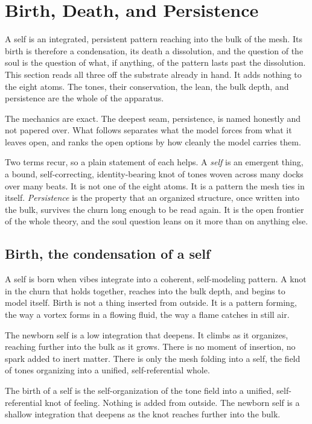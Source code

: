 \section{Birth, Death, and Persistence}

A self is an integrated, persistent pattern reaching into the bulk of the mesh. Its birth is therefore a condensation, its death a dissolution, and the question of the soul is the question of what, if anything, of the pattern lasts past the dissolution. This section reads all three off the substrate already in hand. It adds nothing to the eight atoms. The tones, their conservation, the lean, the bulk depth, and persistence are the whole of the apparatus.

The mechanics are exact. The deepest seam, persistence, is named honestly and not papered over. What follows separates what the model forces from what it leaves open, and ranks the open options by how cleanly the model carries them.

Two terms recur, so a plain statement of each helps. A \emph{self} is an emergent thing, a bound, self-correcting, identity-bearing knot of tones woven across many docks over many beats. It is not one of the eight atoms. It is a pattern the mesh ties in itself. \emph{Persistence} is the property that an organized structure, once written into the bulk, survives the churn long enough to be read again. It is the open frontier of the whole theory, and the soul question leans on it more than on anything else.

\subsection{Birth, the condensation of a self}

A self is born when vibes integrate into a coherent, self-modeling pattern. A knot in the churn that holds together, reaches into the bulk depth, and begins to model itself. Birth is not a thing inserted from outside. It is a pattern forming, the way a vortex forms in a flowing fluid, the way a flame catches in still air.

The newborn self is a low integration that deepens. It climbs as it organizes, reaching further into the bulk as it grows. There is no moment of insertion, no spark added to inert matter. There is only the mesh folding into a self, the field of tones organizing into a unified, self-referential whole.

\begin{definition}
The birth of a self is the self-organization of the tone field into a unified, self-referential knot of feeling. Nothing is added from outside. The newborn self is a shallow integration that deepens as the knot reaches further into the bulk.
\end{definition}

